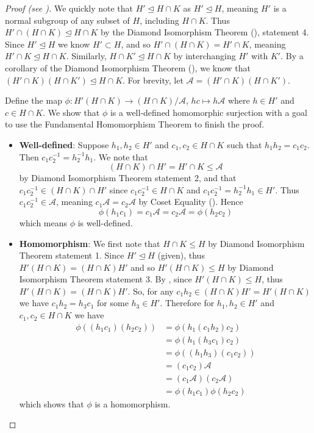 \begin{proof}[Proof (see {\cite[p.~110]{hungerford_1980}})]
    We quickly note that $H' \unlhd H \cap K$ as $H' \unlhd H$, meaning $H'$ is a normal subgroup of any subset of $H$, including $H \cap K$. Thus $H' \cap (H \cap K) \unlhd H \cap K$ by the Diamond Isomorphism Theorem (), statement 4. Since $H'\unlhd H$ we know $H' \subset H$, and so $H' \cap (H \cap K) = H' \cap K$, meaning $H' \cap K \unlhd H \cap K$. Similarly, $H \cap K' \unlhd H \cap K$ by interchanging $H'$ with $K'$. By a corollary of the Diamond Isomorphism Theorem (), we know that $(H' \cap K)(H \cap K') \unlhd H \cap K$. For brevity, let $\mathcal{A} = (H' \cap K)(H \cap K')$.
    
    Define the map $\phi: H'(H\cap K) \to (H\cap K)/\mathcal{A}$, $hc \mapsto h\mathcal{A}$ where $h \in H'$ and $c \in H \cap K$. We show that $\phi$ is a well-defined homomorphic surjection with a goal to use the Fundamental Homomorphism Theorem to finish the proof.
    
    \begin{itemize}
        \item \textbf{Well-defined}: Suppose $h_1, h_2 \in H'$ and $c_1, c_2 \in H \cap K$ such that $h_1h_2 = c_1c_2$. Then $c_1c_2^{-1} = h_2^{-1}h_1$. We note that
        \[
            (H \cap K) \cap H' = H' \cap K \leq \mathcal{A}    
        \]
        by Diamond Isomorphism Theorem statement 2, and that $c_1c_2^{-1} \in (H \cap K) \cap H'$ since $c_1c_2^{-1} \in H \cap K$ and $c_1c_2^{-1} = h_2^{-1}h_1 \in H'$. Thus $c_1c_2^{-1} \in \mathcal{A}$, meaning $c_1\mathcal{A} = c_2\mathcal{A}$ by Coset Equality (). Hence
        \[
            \phi(h_1c_1) = c_1\mathcal{A} = c_2\mathcal{A} = \phi(h_2c_2)        
        \]
        which means $\phi$ is well-defined.
        
        \item \textbf{Homomorphism}: We first note that $H \cap K \leq H$ by Diamond Isomorphism Theorem statement 1. Since $H' \unlhd H$ (given), thus $H'(H\cap K) = (H\cap K)H'$ and so $H'(H\cap K) \leq H$ by Diamond Isomorphism Theorem statement 3. By , since $H'(H\cap K) \leq H$, thus $H'(H\cap K) = (H\cap K)H'$. So, for any $c_1h_2 \in (H\cap K)H' = H'(H\cap K)$ we have $c_1h_2 = h_3c_1$ for some $h_3 \in H'$. Therefore for $h_1, h_2 \in H'$ and $c_1, c_2 \in H \cap K$ we have
        \begin{align*}
            \phi((h_1c_1)(h_2c_2)) &= \phi(h_1(c_1h_2)c_2)\\
            &= \phi(h_1(h_3c_1)c_2)\\
            &= \phi((h_1h_3)(c_1c_2))\\
            &= (c_1c_2)\mathcal{A}\\
            &= (c_1\mathcal{A})(c_2\mathcal{A})\\
            &= \phi(h_1c_1)\phi(h_2c_2)
        \end{align*}
        which shows that $\phi$ is a homomorphism.
        

\end{itemize}
\end{proof}
